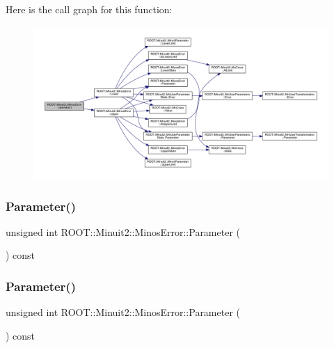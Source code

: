 Here is the call graph for this function\+:
\nopagebreak
\begin{figure}[H]
\begin{center}
\leavevmode
\includegraphics[width=350pt]{d2/dd1/classROOT_1_1Minuit2_1_1MinosError_ae5c75a96400736de9741f6c5b8314e31_cgraph}
\end{center}
\end{figure}
\mbox{\label{classROOT_1_1Minuit2_1_1MinosError_a5d4ac177a8075a3698dbecac3a8c552b}} 
\subsubsection{\texorpdfstring{Parameter()}{Parameter()}\hspace{0.1cm}{\footnotesize\ttfamily [1/3]}}
{\footnotesize\ttfamily unsigned int R\+O\+O\+T\+::\+Minuit2\+::\+Minos\+Error\+::\+Parameter (\begin{DoxyParamCaption}{ }\end{DoxyParamCaption}) const\hspace{0.3cm}{\ttfamily [inline]}}

\mbox{\label{classROOT_1_1Minuit2_1_1MinosError_a5d4ac177a8075a3698dbecac3a8c552b}} 
\subsubsection{\texorpdfstring{Parameter()}{Parameter()}\hspace{0.1cm}{\footnotesize\ttfamily [2/3]}}
{\footnotesize\ttfamily unsigned int R\+O\+O\+T\+::\+Minuit2\+::\+Minos\+Error\+::\+Parameter (\begin{DoxyParamCaption}{ }\end{DoxyParamCaption}) const\hspace{0.3cm}{\ttfamily [inline]}}

